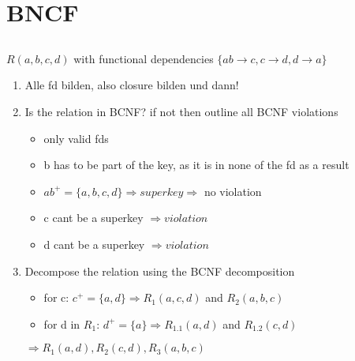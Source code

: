 \documentclass{article}
\begin{document}
\section{BNCF}
\subsection*{} $R(a, b, c, d)$ with functional dependencies
    $\{ab \rightarrow c, c \rightarrow d, d \rightarrow a\}$
\begin{enumerate}
    \item Alle fd bilden, also closure bilden und dann! 
    \item Is the relation in BCNF? if not then outline all BCNF violations 
        \begin{itemize}
            \item only valid fds
            \item b has to be part of the key, as it is in none of the fd as a result
            \item $ab^{+} = \{a, b, c, d\} \Rightarrow superkey \Rightarrow$ no violation
            \item c cant be a superkey $\Rightarrow violation$
            \item d cant be a superkey $\Rightarrow violation$
        \end{itemize} 
    \item Decompose the relation using the BCNF decomposition
        \begin{itemize}
            \item for c: $c^{+} = \{a, d\} \Rightarrow R_{1}(a, c, d)$ and $R_{2}(a, b, c)$
            \item for d in $R_{1}$: $d^{+} = \{a\} \Rightarrow R_{1.1}(a, d)$ and $R_{1.2}(c, d)$
        \end{itemize}
    $\Rightarrow R_{1}(a, d), R_{2}(c, d), R_{3}(a, b, c)$
\end{enumerate}
\end{document}
